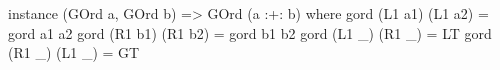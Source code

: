 \begin{code}
instance (GOrd a, GOrd b) => GOrd (a :+: b) where
  gord (L1 a1) (L1 a2) = gord a1 a2
  gord (R1 b1) (R1 b2) = gord b1 b2
  gord (L1 _)  (R1 _)  = LT
  gord (R1 _)  (L1 _)  = GT
\end{code}
